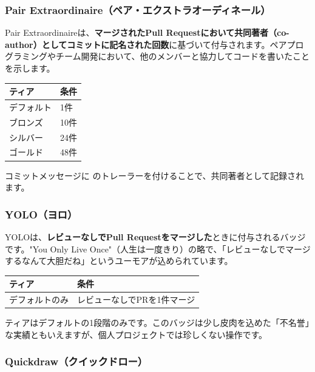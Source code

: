 \subsubsection{Pair Extraordinaire（ペア・エクストラオーディネール）}

Pair Extraordinaireは、\textbf{マージされたPull Requestにおいて共同著者（co-author）としてコミットに記名された回数}に基づいて付与されます。ペアプログラミングやチーム開発において、他のメンバーと協力してコードを書いたことを示します。

\begin{table}[htbp]
\centering
\begin{tabular}{ll}
\hline
\textbf{ティア} & \textbf{条件} \\
\hline
デフォルト & 1件 \\
ブロンズ & 10件 \\
シルバー & 24件 \\
ゴールド & 48件 \\
\hline
\end{tabular}
\end{table}

コミットメッセージに  のトレーラーを付けることで、共同著者として記録されます。

\subsubsection{YOLO（ヨロ）}

YOLOは、\textbf{レビューなしでPull Requestをマージした}ときに付与されるバッジです。"You Only Live Once"（人生は一度きり）の略で、「レビューなしでマージするなんて大胆だね」というユーモアが込められています。

\begin{table}[htbp]
\centering
\begin{tabular}{ll}
\hline
\textbf{ティア} & \textbf{条件} \\
\hline
デフォルトのみ & レビューなしでPRを1件マージ \\
\hline
\end{tabular}
\end{table}

ティアはデフォルトの1段階のみです。このバッジは少し皮肉を込めた「不名誉」な実績ともいえますが、個人プロジェクトでは珍しくない操作です。

\subsubsection{Quickdraw（クイックドロー）}

